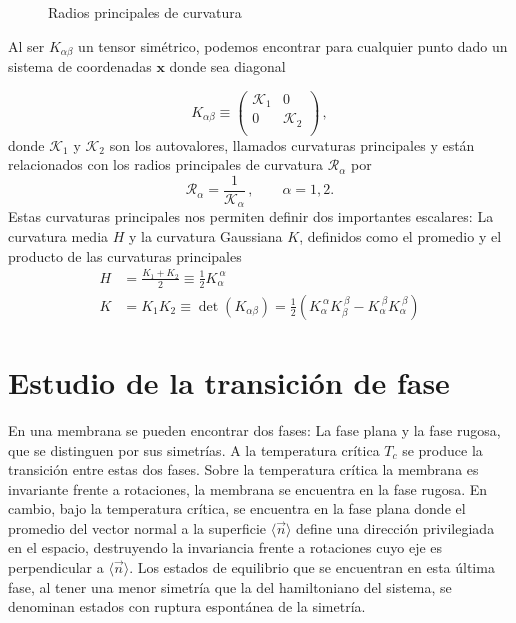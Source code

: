 \begin{figure}[h]
\centering
 \resizebox{\columnwidth}{!}{}
\caption{Radios principales de curvatura}
\end{figure}

Al ser $K_{\alpha\beta}$ un tensor simétrico, podemos encontrar para cualquier
punto dado un sistema de coordenadas $\mathbf{x}$ donde sea diagonal

\begin{equation*}
K_{\alpha\beta}\equiv\left(\begin{array}{cc}
\mathcal{K}_1 & 0\\
0 & \mathcal{K}_2\\
\end{array}\right)\, ,
\end{equation*} 
donde $\mathcal{K}_1$ y $\mathcal{K}_2$ son los autovalores, llamados
curvaturas principales y están relacionados con los radios principales
 de curvatura $\mathcal{R}_{\alpha}$ por
\begin{equation*}
\mathcal{R}_{\alpha}=\frac{1}{\mathcal{K}_{\alpha}} \, , \qquad \alpha=1,2.
\end{equation*}
Estas curvaturas principales nos permiten definir dos importantes escalares:
La curvatura media $H$ y la curvatura Gaussiana $K$, definidos como el
promedio y el producto de las curvaturas principales
\begin{align}
H&=\frac{K_1+K_2}{2}\equiv \frac{1}{2}K_{\alpha}^{\ \alpha}\\
K&=K_1K_2\equiv \det(K_{\alpha\beta})=\frac{1}{2}(K_{\alpha}^{\ \alpha}K_{\beta}^{\ \beta}-K_{\alpha}^{\ \beta}K_{\alpha}^{\ \beta})
\end{align}

\section{Estudio de la transición de fase}

En una membrana se pueden encontrar dos fases: La fase plana y la fase
rugosa, que se distinguen por sus simetrías. A la temperatura crítica $T_c$ se
produce la transición entre estas dos fases. Sobre la temperatura crítica la
membrana es invariante frente a rotaciones, 
la membrana se encuentra en la fase rugosa. En cambio, bajo la temperatura
crítica, se encuentra en la fase plana donde el promedio del vector normal a
la superficie $\langle \vec{n}\rangle$ define una dirección privilegiada en el
espacio, destruyendo la invariancia frente a rotaciones cuyo eje es
perpendicular a $\langle \vec{n}\rangle$. Los estados de equilibrio que se
encuentran en esta última fase, al tener una menor simetría que la del
hamiltoniano del sistema, se denominan estados con ruptura espontánea de la
simetría. 
 
